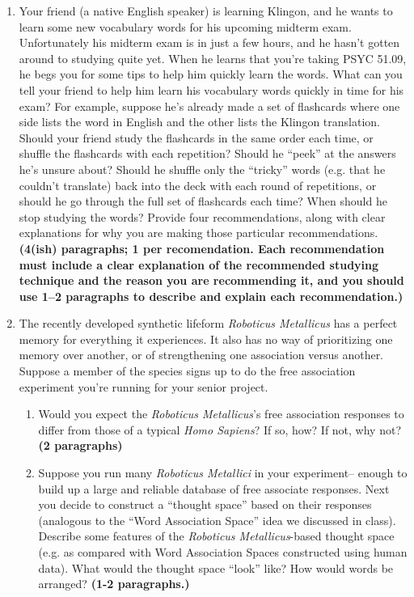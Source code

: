 \documentclass[10pt]{article}
\begin{document}
\begin{enumerate}
\item Your friend (a native English speaker) is learning Klingon, and
  he wants to learn some new vocabulary words for his upcoming midterm
  exam.  Unfortunately his midterm exam is in just a few hours, and he
  hasn't gotten around to studying quite yet.  When he learns that
  you're taking PSYC 51.09, he begs you for some tips to help him
  quickly learn the words.  What can you tell your friend to help him
  learn his vocabulary words quickly in time for his exam?  For
  example, suppose he's already made a set of flashcards where one
  side lists the word in English and the other lists the Klingon
  translation.  Should your friend study the flashcards in the same
  order each time, or shuffle the flashcards with each repetition?
  Should he ``peek'' at the answers he's unsure about?  Should he
  shuffle only the ``tricky'' words (e.g. that he couldn't translate)
  back into the deck with each round of repetitions, or should he go
  through the full set of flashcards each time?  When should he stop
  studying the words?  Provide four recommendations, along with clear
  explanations for why you are making those particular
  recommendations.  \textbf{(4(ish) paragraphs; 1 per recomendation.  Each recommendation must include a clear
    explanation of the recommended studying technique and the reason
    you are recommending it, and you should use 1--2 paragraphs to
    describe and explain each recommendation.)}

\item The recently developed synthetic lifeform \textit{Roboticus Metallicus} has a
  perfect memory for everything it experiences.  It also has no way of
  prioritizing one memory over another, or of strengthening one
  association versus another.  Suppose a member of the species signs
  up to do the free association experiment you're running for your
  senior project.
\begin{enumerate}
\item Would you expect the \textit{Roboticus Metallicus}'s free
  association responses to differ from those of a typical \textit{Homo
    Sapiens}?  If so, how?  If not, why not?  \textbf{(2 paragraphs)}
\item Suppose you run many \textit{Roboticus Metallici} in your
  experiment-- enough to build up a large and reliable database of free
  associate responses.  Next you decide to construct a ``thought space''
  based on their responses (analogous to the ``Word Association
  Space'' idea we discussed in class).  Describe some features of the
  \textit{Roboticus Metallicus}-based thought space (e.g. as compared
  with Word Association Spaces constructed using human data).
  What would the thought space ``look'' like?  How would words be
  arranged?
  \textbf{(1-2 paragraphs.)}
\end{enumerate}
\end{enumerate}
\end{document}

